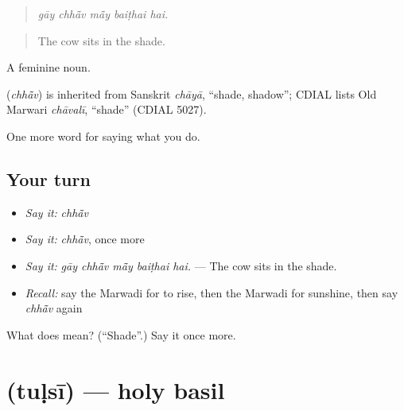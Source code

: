 \begin{quote}
    
\end{quote}

\begin{quote}
\emph{gāy chhā̃v mā̃y baiṭhai hai.}
\end{quote}

\begin{quote}
The cow sits in the shade.
\end{quote}

A feminine noun.

\begin{cousinweb}
\textbf{} (\emph{chhā̃v}) is inherited from Sanskrit \emph{chāyā}, \textquotedblleft{}shade, shadow\textquotedblright{}; CDIAL lists Old Marwari \emph{chāvalī}, \textquotedblleft{}shade\textquotedblright{} (CDIAL 5027).
\end{cousinweb}

\begin{grammarlens}[title={What you've built}]
One more word for saying what you do.
\end{grammarlens}

\subsection*{Your turn}
\begin{itemize}
\raggedright
  \item \emph{Say it:} \emph{chhā̃v}
  \item \emph{Say it:} \emph{chhā̃v}, once more
  \item \emph{Say it:} \emph{gāy chhā̃v mā̃y baiṭhai hai.} — The cow sits in the shade.
  \item \emph{Recall:} say the Marwadi for to rise, then the Marwadi for sunshine, then say \emph{chhā̃v} again
\end{itemize}

\begin{tcolorbox}[breakable,colback=teal!4,colframe=teal!35!black,title={Before you move on}]
What does  mean? (\textquotedblleft{}Shade\textquotedblright{}.) Say it once more.
\end{tcolorbox}
\section[\texorpdfstring{\mw{तुळसी} (tuḷsī)}{तुळसी (tuḷsī)}]{ (tuḷsī) — holy basil}

\label{lesson:MW-C168-tulsi}



